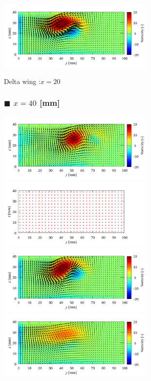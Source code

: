 \documentclass[twocolumn,a4j]{jsarticle}
\begin{document}
\begin{figure}[htbp]
{		
		\includegraphics[keepaspectratio, width=78mm]{../images/Simulation/4_Smagorinsky/x=20.png}
	}
	\caption{Delta wing :$x=20$}
\end{figure}

\newpage
\begin{figure}[htbp]
	\subsubsection*{$\blacksquare$ $x=40$ [mm]}
	\centering
	{
		\includegraphics[keepaspectratio, width=78mm]{../images/Simulation/Compare/experiment_x=40.png}
		\includegraphics[keepaspectratio, width=78mm]{../images/Simulation/0_Mesh/x=40.png}
		\includegraphics[keepaspectratio, width=78mm]{../images/Simulation/1_Laminar/x=40.png}
		\includegraphics[keepaspectratio, width=78mm]{../images/Simulation/2_kEpsilon/x=40.png}
}
\end{figure}
\end{document}
